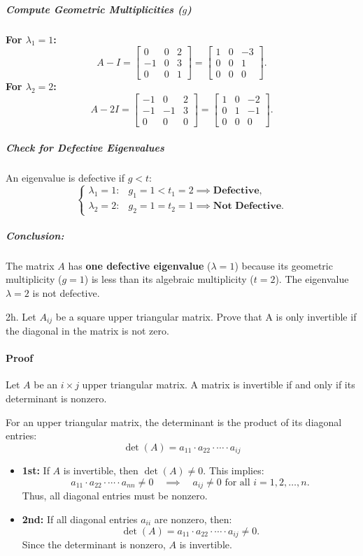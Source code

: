 \documentclass[12pt,letterpaper]{article}
\begin{document}
\subparagraph{Compute Geometric Multiplicities (\( g \))}
\textbf{For \( \lambda_1 = 1 \):}  
\[
A - I = \begin{bmatrix}
0 & 0 & 2 \\
-1 & 0 & 3 \\
0 & 0 & 1
\end{bmatrix} = \begin{bmatrix}
1 & 0 & -3 \\
0 & 0 & 1 \\
0 & 0 & 0
\end{bmatrix}.
\]
\textbf{For \( \lambda_2 = 2 \):}  
\[
A - 2I = \begin{bmatrix}
-1 & 0 & 2 \\
-1 & -1 & 3 \\
0 & 0 & 0
\end{bmatrix} = \begin{bmatrix}
1 & 0 & -2 \\
0 & 1 & -1 \\
0 & 0 & 0
\end{bmatrix}.
\]

\subparagraph{Check for Defective Eigenvalues}  
An eigenvalue is defective if \( g < t \):
\[
\begin{cases}
\lambda_1 = 1: & g_1 = 1 < t_1 = 2 \implies \textbf{Defective}, \\
\lambda_2 = 2: & g_2 = 1 = t_2 = 1 \implies \textbf{Not Defective}.
\end{cases}
\]

\subparagraph{Conclusion:}  
The matrix \( A \) has \textbf{one defective eigenvalue} (\( \lambda = 1 \)) because its geometric multiplicity (\( g = 1 \)) is less than its algebraic multiplicity (\( t = 2 \)). The eigenvalue \( \lambda = 2 \) is not defective.

\pagebreak

2h. Let $A_{ij}$ be a square upper triangular matrix. Prove that A is only invertible if the
diagonal in the matrix is not zero.

\paragraph{Proof}
Let \( A \) be an \( i \times j \) upper triangular matrix. A matrix is invertible if and only if its determinant is nonzero. 

For an upper triangular matrix, the determinant is the product of its diagonal entries:
\[
\det(A) = a_{11} \cdot a_{22} \cdot \cdots \cdot a_{ij}
\]

\begin{itemize}
    \item \textbf{1st:} 
    If \( A \) is invertible, then \( \det(A) \neq 0 \). This implies:
    \[
    a_{11} \cdot a_{22} \cdot \cdots \cdot a_{nn} \neq 0 \quad \implies \quad a_{ij} \neq 0 \text{ for all } i = 1, 2, \dots, n.
    \]
    Thus, all diagonal entries must be nonzero.
    
    \item \textbf{2nd:} 
    If all diagonal entries \( a_{ii} \) are nonzero, then:
    \[
    \det(A) = a_{11} \cdot a_{22} \cdot \cdots \cdot a_{ij} \neq 0.
    \]
    Since the determinant is nonzero, \( A \) is invertible.
\end{itemize}
\end{document}
